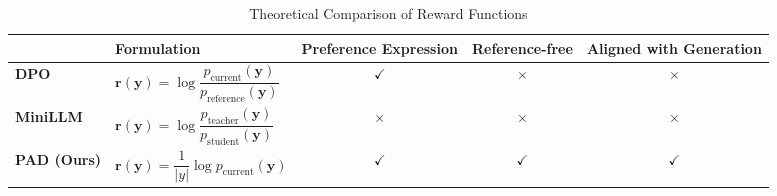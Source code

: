 \begin{table*}[ht]
\centering
\small
\begin{tabular}{@{} l l c c c @{}}
\toprule
& \textbf{Formulation} 
& \textbf{Preference Expression} 
& \textbf{Reference-free} 
& \textbf{Aligned with Generation} 
\\
\midrule

\textbf{DPO} 
& $\mathbf{r}(\boldsymbol{y}) = \log \dfrac{p_\text{current}(\boldsymbol{y})}{p_\text{reference}(\boldsymbol{y})}$ 
& $\checkmark$ 
& $\times$ 
& $\times$ 
\\[0.8ex]

\textbf{MiniLLM} 
& $\mathbf{r}(\boldsymbol{y}) = \log \dfrac{p_\text{teacher}(\boldsymbol{y})}{p_\text{student}(\boldsymbol{y})}$ 
& $\times$ 
& $\times$ 
& $\times$ 
\\[0.8ex]

\textbf{PAD (Ours)} 
& $\mathbf{r}(\boldsymbol{y}) = \dfrac{1}{| y |} \log p_\text{current}(\boldsymbol{y})$ 
& $\checkmark$ 
& $\checkmark$ 
& $\checkmark$ 
\\[0.8ex] %

\bottomrule
\end{tabular}
\caption{Theoretical Comparison of Reward Functions}
\label{tab:reward_comparison}

\vspace{-0.5em}
\end{table*}
